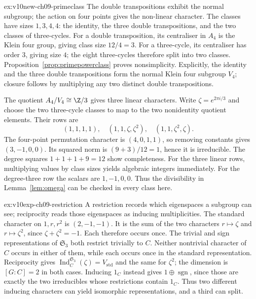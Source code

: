 \begin{solution}{ex:v10new-ch09-primeclass}
\idea The double transpositions exhibit the normal subgroup; the action on four points gives the non-linear character.
\writeup The classes have sizes $1,3,4,4$: the identity, the three double transpositions, and the two classes of three-cycles. For a double transposition, its centraliser in $A_4$ is the Klein four group, giving class size $12/4=3$. For a three-cycle, its centraliser has order $3$, giving size $4$; the eight three-cycles therefore split into two classes. Proposition~\ref{prop:primepowerclass} proves nonsimplicity. Explicitly, the identity and the three double transpositions form the normal Klein four subgroup $V_4$; closure follows by multiplying any two distinct double transpositions.

The quotient $A_4/V_4\cong\Z/3$ gives three linear characters. Write $\zeta=e^{2\pi i/3}$ and choose the two three-cycle classes to map to the two nonidentity quotient elements. Their rows are
\[
(1,1,1,1),\quad(1,1,\zeta,\zeta^2),
\quad(1,1,\zeta^2,\zeta).
\]
The four-point permutation character is $(4,0,1,1)$, so removing constants gives $(3,-1,0,0)$. Its squared norm is $(9+3)/12=1$, hence it is irreducible. The degree squares $1+1+1+9=12$ show completeness. For the three linear rows, multiplying values by class sizes yields algebraic integers immediately. For the degree-three row the scalars are $1,-1,0,0$. Thus the divisibility in Lemma~\ref{lem:omega} can be checked in every class here.
\end{solution}

\begin{solution}{ex:v10exp-ch09-restriction}
\idea A restriction records which eigenspaces a subgroup can see; reciprocity reads those eigenspaces as inducing multiplicities.
\writeup The standard character on $1,r,r^2$ is $(2,-1,-1)$. It is the sum of the two characters $r\mapsto\zeta$ and $r\mapsto\zeta^2$, since $\zeta+\zeta^2=-1$. Each therefore occurs once. The trivial and sign representations of $\mathfrak S_3$ both restrict trivially to $C$. Neither nontrivial character of $C$ occurs in either of them, while each occurs once in the standard representation. Reciprocity gives $\operatorname{Ind}_C^{\mathfrak S_3}(\zeta)=V_{\mathrm{std}}$ and the same for $\zeta^2$; the dimension is $[G:C]=2$ in both cases. Inducing $1_C$ instead gives $1\oplus\operatorname{sgn}$, since those are exactly the two irreducibles whose restrictions contain $1_C$. Thus two different inducing characters can yield isomorphic representations, and a third can split.
\end{solution}

